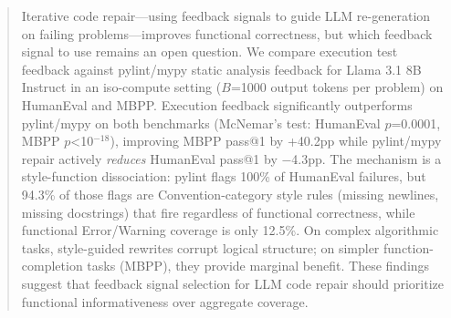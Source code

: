 \begin{abstract}
Iterative code repair---using feedback signals to guide LLM re-generation on failing problems---improves functional correctness, but which feedback signal to use remains an open question. We compare execution test feedback against pylint/mypy static analysis feedback for Llama 3.1 8B Instruct in an iso-compute setting ($B$=1000 output tokens per problem) on HumanEval and MBPP. Execution feedback significantly outperforms pylint/mypy on both benchmarks (McNemar's test: HumanEval $p$=0.0001, MBPP $p$<10$^{-18}$), improving MBPP pass@1 by +40.2pp while pylint/mypy repair actively \emph{reduces} HumanEval pass@1 by $-$4.3pp. The mechanism is a style-function dissociation: pylint flags 100\% of HumanEval failures, but 94.3\% of those flags are Convention-category style rules (missing newlines, missing docstrings) that fire regardless of functional correctness, while functional Error/Warning coverage is only 12.5\%. On complex algorithmic tasks, style-guided rewrites corrupt logical structure; on simpler function-completion tasks (MBPP), they provide marginal benefit. These findings suggest that feedback signal selection for LLM code repair should prioritize functional informativeness over aggregate coverage.
\end{abstract}
